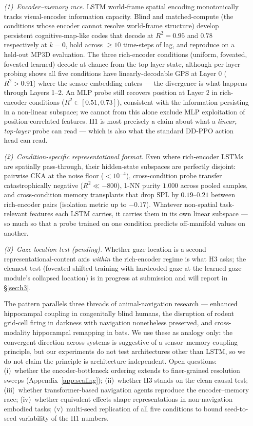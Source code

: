 \documentclass{article}
\begin{document}
\emph{(1)~Encoder--memory race.} LSTM world-frame spatial encoding monotonically tracks visual-encoder information capacity. Blind and matched-compute (the conditions whose encoder cannot resolve world-frame structure) develop persistent cognitive-map-like codes that decode at $R^2 = 0.95$ and $0.78$ respectively at $k=0$, hold across $\geq 10$ time-steps of lag, and reproduce on a held-out MP3D evaluation. The three rich-encoder conditions (uniform, foveated, foveated-learned) decode at chance from the top-layer state, although per-layer probing shows all five conditions have linearly-decodable GPS at Layer 0 ($R^2 > 0.91$) where the sensor embedding enters --- the divergence is what happens through Layers 1--2. An MLP probe still recovers position at Layer 2 in rich-encoder conditions ($R^2 \in [0.51, 0.73]$), consistent with the information persisting in a non-linear subspace; we cannot from this alone exclude MLP exploitation of position-correlated features. H1 is most precisely a claim about what a \emph{linear, top-layer} probe can read --- which is also what the standard DD-PPO action head can read.

\emph{(2)~Condition-specific representational format.} Even where rich-encoder LSTMs are spatially pass-through, their hidden-state subspaces are perfectly disjoint: pairwise CKA at the noise floor ($<10^{-4}$), cross-condition probe transfer catastrophically negative ($R^2 \ll -800$), 1-NN purity $1.000$ across pooled samples, and cross-condition memory transplants that drop SPL by $0.19$--$0.21$ between rich-encoder pairs (isolation metric up to $-0.17$). Whatever non-spatial task-relevant features each LSTM carries, it carries them in its own linear subspace --- so much so that a probe trained on one condition predicts off-manifold values on another.

\emph{(3)~Gaze-location test (pending).} Whether gaze location is a second representational-content axis \emph{within} the rich-encoder regime is what H3 asks; the cleanest test (foveated-shifted training with hardcoded gaze at the learned-gaze module's collapsed location) is in progress at submission and will report in §\ref{sec:h3}.

The pattern parallels three threads of animal-navigation research --- enhanced hippocampal coupling in congenitally blind humans, the disruption of rodent grid-cell firing in darkness with navigation nonetheless preserved, and cross-modality hippocampal remapping in bats. We use these as analogy only: the convergent direction across systems is suggestive of a sensor--memory coupling principle, but our experiments do not test architectures other than LSTM, so we do not claim the principle is architecture-independent. Open questions: (i)~whether the encoder-bottleneck ordering extends to finer-grained resolution sweeps (Appendix~\ref{app:scaling}); (ii)~whether H3 stands on the clean causal test; (iii)~whether transformer-based navigation agents reproduce the encoder--memory race; (iv)~whether equivalent effects shape representations in non-navigation embodied tasks; (v)~multi-seed replication of all five conditions to bound seed-to-seed variability of the H1 numbers.
\end{document}
